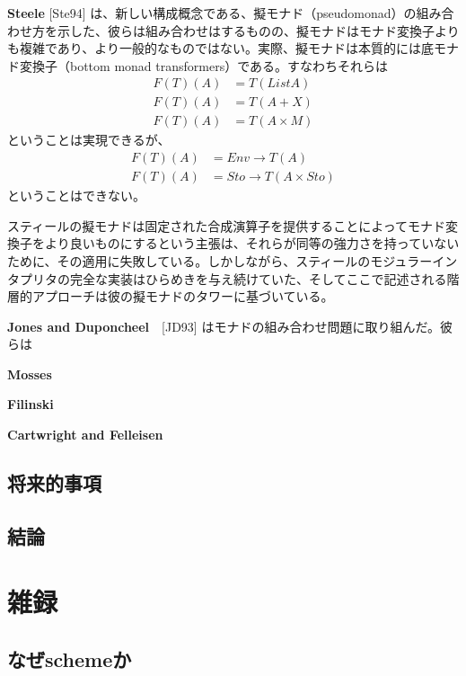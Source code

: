 \documentclass[11pt, oneside]{jsbook}   	%
\begin{document}
{\bf Steele} [Ste94] は、新しい構成概念である、擬モナド（pseudomonad）の組み合わせ方を示した、彼らは組み合わせはするものの、擬モナドはモナド変換子よりも複雑であり、より一般的なものではない。実際、擬モナドは本質的には底モナド変換子（bottom monad transformers）である。すなわちそれらは
$$
\begin{aligned}
F(T)(A) & = T(List A)\\
F(T)(A) &= T(A+X)\\
F(T)(A) &= T(A \times M)
\end{aligned}
$$
ということは実現できるが、
$$
\begin{aligned}
F(T)(A) &= Env \rightarrow T(A)\\
F(T)(A) &= Sto \rightarrow T(A \times Sto)
\end{aligned}
$$
ということはできない。

スティールの擬モナドは固定された合成演算子を提供することによってモナド変換子をより良いものにするという主張は、それらが同等の強力さを持っていないために、その適用に失敗している。しかしながら、スティールのモジュラーインタプリタの完全な実装はひらめきを与え続けていた、そしてここで記述される階層的アプローチは彼の擬モナドのタワーに基づいている。

{\bf Jones and Duponcheel}　[JD93] はモナドの組み合わせ問題に取り組んだ。彼らは

{\bf Mosses}

{\bf Filinski}

{\bf Cartwright and Felleisen}


\section{ 将来的事項 }
\section{ 結論 }



\newpage
\renewcommand{\thechapter}{\Alph{chapter}}
\renewcommand{\thesection}{\thechapter-\arabic{section}}
\renewcommand{\prechaptername}{}
\renewcommand{\postchaptername}{}
\setcounter{chapter}{0}

\chapter{ 雑録 }
\section{ なぜschemeか }
\end{document}
